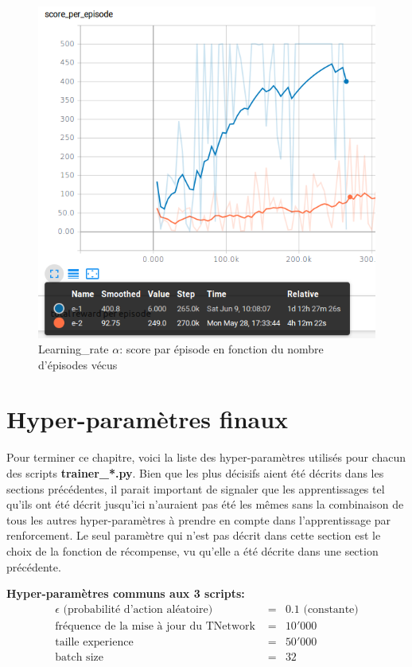 \documentclass[11pt,a4paper]{report}
\begin{document}
   \begin{figure}[!h]
   \center
   \includegraphics[scale=0.5]{ressources/learning_rate_graph.png}
   \caption{Learning\_rate $\alpha$: score par épisode en fonction du nombre d'épisodes vécus}
   \end{figure} 
   
  \newpage
  \section{Hyper-paramètres finaux}
  
  \par Pour terminer ce chapitre, voici la liste des hyper-paramètres utilisés pour chacun des scripts \textbf{trainer\_*.py}. Bien que les plus décisifs aient été décrits dans les sections précédentes, il parait important de signaler que les apprentissages tel qu'ils ont été décrit jusqu'ici n'auraient pas été les mêmes sans la combinaison de tous les autres hyper-paramètres à prendre en compte dans l'apprentissage par renforcement. Le seul paramètre qui n'est pas décrit dans cette section est le choix de la fonction de récompense, vu qu'elle a été décrite dans une section précédente. 
  
   \textbf{Hyper-paramètres communs aux 3 scripts:}   
   \begin{eqnarray}
   \epsilon \text{ (probabilité d'action aléatoire) } &=& 0.1 \text{ (constante)} \\
   \text{fréquence de la mise à jour du TNetwork } &=& 10'000 \\
   \text{taille experience } &=& 50'000 \\
   \text{batch size } &=& 32 
   \end{eqnarray}
   
\end{document}
